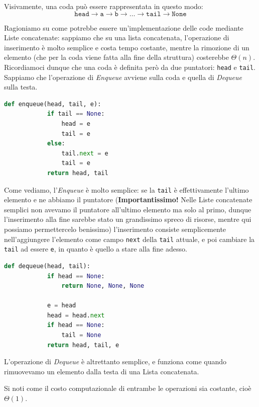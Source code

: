 \documentclass[12pt]{report}
\begin{document}
    Visivamente, una coda può essere rappresentata in questo modo:
    \[
    \texttt{head} \rightarrow \texttt{a} \rightarrow \texttt{b} \rightarrow \dots \rightarrow \texttt{tail} \rightarrow \texttt{None}
    \]
    
    Ragioniamo su come potrebbe essere un'implementazione delle code mediante Liste concatenate: sappiamo che su una lista concatenata, l'operazione di inserimento è molto semplice e costa tempo costante, mentre la rimozione di un elemento (che per la coda viene fatta alla fine della struttura) costerebbe $\Theta(n)$. Ricordiamoci dunque che una coda è definita però da due puntatori: \texttt{head} e \texttt{tail}. Sappiamo che l'operazione di \textit{Enqueue} avviene sulla coda e quella di \textit{Dequeue} sulla testa. 
    
    \begin{lstlisting}[language=Python, caption={Operazione di Enqueue (Inserimento) in una coda}]
    	def enqueue(head, tail, e):
    		if tail == None:
    			head = e
    			tail = e
    		else:
    			tail.next = e
    			tail = e
    		return head, tail
    \end{lstlisting}
    
    Come vediamo, l'\textit{Enqueue} è molto semplice: se la \texttt{tail} è effettivamente l'ultimo elemento e ne abbiamo il puntatore (\textbf{Importantissimo!} Nelle Liste concatenate semplici non avevamo il puntatore all'ultimo elemento ma solo al primo, dunque l'inserimento alla fine sarebbe stato un grandissimo spreco di risorse, mentre qui possiamo permettercelo benissimo) l'inserimento consiste semplicemente nell'aggiungere l'elemento come campo \texttt{next} della \texttt{tail} attuale, e poi cambiare la \texttt{tail} ad essere \texttt{e}, in quanto è quello a stare alla fine adesso.
    
    \begin{lstlisting}[language=Python, caption={Operazione di Dequeue (Estrazione) da una coda}]
    	def dequeue(head, tail):
    		if head == None:
    			return None, None, None
    		
    		e = head
    		head = head.next
    		if head == None:
    			tail = None
    		return head, tail, e
    \end{lstlisting}
    
    L'operazione di \textit{Dequeue} è altrettanto semplice, e funziona come quando rimuovevamo un elemento dalla testa di una Lista concatenata.
    
    Si noti come il costo computazionale di entrambe le operazioni sia costante, cioè $\Theta(1)$.
    
\end{document}
